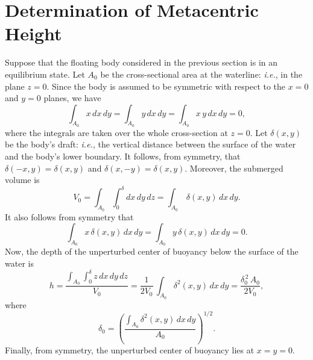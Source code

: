 \section{Determination of Metacentric Height}
Suppose that the floating body considered in the previous section is in an equilibrium  state.
Let $A_0$ be the  cross-sectional area  at the waterline: {\em i.e.}, in the plane $z=0$. Since  the
body is assumed to be symmetric with respect to
the $x=0$ and $y=0$ planes, we have
\begin{equation}\label{e6.26}
\int_{A_0}x\,dx\,dy = \int_{A_0}y\,dx\,dy=\int_{A_0}x\,y\,dx\,dy=0,
\end{equation}
where the integrals are taken over the whole cross-section at $z=0$. 
Let $\delta(x,y)$ be the body's draft: {\em i.e.}, the vertical distance between the surface of the water and the body's lower boundary. It follows, from symmetry, that $\delta(-x,y)=\delta(x,y)$ and $\delta(x,-y)=\delta(x,y)$. Moreover, the submerged volume is
\begin{equation}\label{e6.27}
V_0 =\int_{A_0}\int_0^\delta dx\,dy\,dz= \int_{A_0}\,\delta (x,y)\,dx\,dy.
\end{equation}
It also follows from symmetry that
\begin{equation}\label{e6.29}
\int_{A_0} x\,
\delta(x,y)\,dx\,dy= \int_{A_0}y\,\delta(x,y)\,dx\,dy = 0.
\end{equation}
Now, the depth of the unperturbed center of buoyancy below the surface of the water is
\begin{equation}\label{e6.30}
 h = \frac{\int_{A_0}\int_0^\delta z\,dx\,dy\,dz}{V_0}=\frac{1}{2V_0}\,\int_{A_0} \delta^2(x,y)\,dx\,dy=\frac{\delta_0^{\,2}\,A_0}{2V_0},
\end{equation}
where
\begin{equation}
\delta_0 = \left(\frac{\int_{A_0}\delta^2(x,y)\,dx\,dy}{A_0}\right)^{1/2}.
\end{equation}
Finally, from symmetry, the unperturbed center of buoyancy lies at $x=y=0$. 


